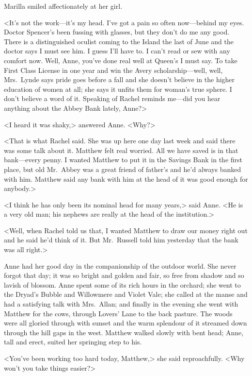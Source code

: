 Marilla smiled affectionately at her girl.

<It's not the work—it's my head. I've got a pain so often now—behind my eyes. Doctor Spencer's been fussing with glasses, but they don't do me any good. There is a distinguished oculist coming to the Island the last of June and the doctor says I must see him. I guess I'll have to. I can't read or sew with any comfort now. Well, Anne, you've done real well at Queen's I must say. To take First Class License in one year and win the Avery scholarship—well, well, Mrs.~Lynde says pride goes before a fall and she doesn't believe in the higher education of women at all; she says it unfits them for woman's true sphere. I don't believe a word of it. Speaking of Rachel reminds me—did you hear anything about the Abbey Bank lately, Anne?>

<I heard it was shaky,> answered Anne. <Why?>

<That is what Rachel said. She was up here one day last week and said there was some talk about it. Matthew felt real worried. All we have saved is in that bank—every penny. I wanted Matthew to put it in the Savings Bank in the first place, but old Mr.~Abbey was a great friend of father's and he'd always banked with him. Matthew said any bank with him at the head of it was good enough for anybody.>

<I think he has only been its nominal head for many years,> said Anne. <He is a very old man; his nephews are really at the head of the institution.>

<Well, when Rachel told us that, I wanted Matthew to draw our money right out and he said he'd think of it. But Mr.~Russell told him yesterday that the bank was all right.>

Anne had her good day in the companionship of the outdoor world. She never forgot that day; it was so bright and golden and fair, so free from shadow and so lavish of blossom. Anne spent some of its rich hours in the orchard; she went to the Dryad's Bubble and Willowmere and Violet Vale; she called at the manse and had a satisfying talk with Mrs.~Allan; and finally in the evening she went with Matthew for the cows, through Lovers' Lane to the back pasture. The woods were all gloried through with sunset and the warm splendour of it streamed down through the hill gaps in the west. Matthew walked slowly with bent head; Anne, tall and erect, suited her springing step to his.

<You've been working too hard today, Matthew,> she said reproachfully. <Why won't you take things easier?>


